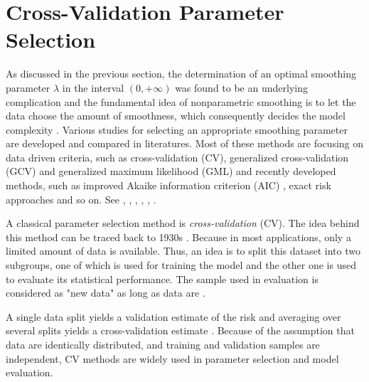 \section{Cross-Validation Parameter Selection}

As discussed in the previous section, the determination of an optimal smoothing parameter $\lambda$ in the interval $(0,+\infty)$ was found to be an underlying complication and the fundamental idea of nonparametric smoothing is to let the data choose the amount of smoothness, which consequently decides the model complexity \cite{gu1998model}. Various studies for selecting an appropriate smoothing parameter are developed and compared in literatures. Most of these methods are focusing on data driven criteria, such as cross-validation (CV), generalized cross-validation (GCV) \cite{craven1978smoothing} and generalized maximum likelihood (GML) \cite{wahba1985comparison} and recently developed methods, such as improved Akaike information criterion (AIC) \cite{hurvich1998smoothing}, exact risk approaches \cite{wand1997exact} and so on. See \eg \cite{craven1978smoothing}, \cite{hardle1988far}, \cite{hardle1990applied}, \cite{wahba1990spline},  \cite{green1993nonparametric}, \cite{cantoni2001resistant} \cite{aydin2013smoothing}.  



A classical parameter selection method is \textit{cross-validation} (CV). The idea behind this method can be traced back to 1930s \cite{larson1931shrinkage}. Because in most applications, only a limited amount of data is available. Thus, an idea is to split this dataset into two subgroups, one of which is used for training the model and the other one is used to evaluate its statistical performance. The sample used in evaluation is considered as "new data" as long as data are \iid. 

A single data split yields a validation estimate of the risk and averaging over several splits yields a cross-validation estimate \cite{arlot2010survey}. Because of the assumption that data are identically distributed, and training and validation samples are independent, CV methods are widely used in parameter selection and model evaluation. 


